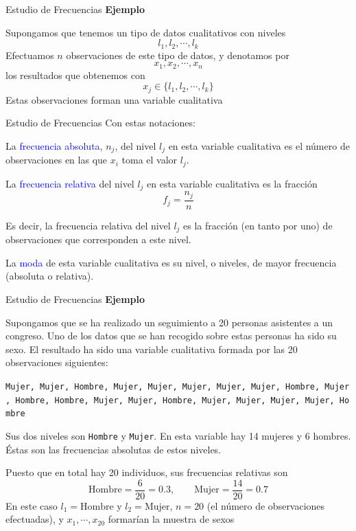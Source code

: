 \documentclass[
  ignorenonframetext,
]{beamer}
\newcommand\blue[1]{\textcolor{blue}{#1}}
\begin{document}
\begin{frame}{Estudio de Frecuencias}
\label{estudio-de-frecuencias-1}
\textbf{Ejemplo}

Supongamos que tenemos un tipo de datos cualitativos con niveles
\[l_1,l_2,\cdots,l_k\] Efectuamos \(n\) observaciones de este tipo de
datos, y denotamos por \[x_1,x_2,\cdots,x_n\] los resultados que
obtenemos con \[x_j\in\{l_1, l_2,\cdots, l_k\}\] Estas observaciones
forman una variable cualitativa
\end{frame}

\begin{frame}{Estudio de Frecuencias}
\label{estudio-de-frecuencias-2}
Con estas notaciones:

La \blue{frecuencia absoluta}, \(n_j\), del nivel \(l_j\) en esta
variable cualitativa es el número de observaciones en las que \(x_i\)
toma el valor \(l_j\).

La \blue{frecuencia relativa} del nivel \(l_j\) en esta variable
cualitativa es la fracción \[f_j = \frac{n_j}{n}\]

Es decir, la frecuencia relativa del nivel \(l_j\) es la fracción (en
tanto por uno) de observaciones que corresponden a este nivel.

La \blue{moda} de esta variable cualitativa es su nivel, o niveles, de
mayor frecuencia (absoluta o relativa).
\end{frame}

\begin{frame}[fragile]{Estudio de Frecuencias}
\label{estudio-de-frecuencias-3}
\textbf{Ejemplo}

Supongamos que se ha realizado un seguimiento a 20 personas asistentes a
un congreso. Uno de los datos que se han recogido sobre estas personas
ha sido su sexo. El resultado ha sido una variable cualitativa formada
por las 20 observaciones siguientes:

\texttt{Mujer,\ Mujer,\ Hombre,\ Mujer,\ Mujer,\ Mujer,\ Mujer,\ Mujer,\ Hombre,\ Mujer,\ Hombre,\ Hombre,\ Mujer,\ Mujer,\ Hombre,\ Mujer,\ Mujer,\ Mujer,\ Mujer,\ Hombre}

Sus dos niveles son \texttt{Hombre} y \texttt{Mujer}. En esta variable
hay 14 mujeres y 6 hombres. Éstas son las frecuencias absolutas de estos
niveles.

Puesto que en total hay 20 individuos, sus frecuencias relativas son
\[\text{Hombre} = \frac{6}{20} = 0.3,\qquad \text{Mujer} = \frac{14}{20} = 0.7\]
En este caso \(l_1 = \text{Hombre}\) y \(l_2 = \text{Mujer}\),
\(n = 20\) (el número de observaciones efectuadas), y
\(x_1,\cdots, x_{20}\) formarían la muestra de sexos
\end{frame}
\end{document}
